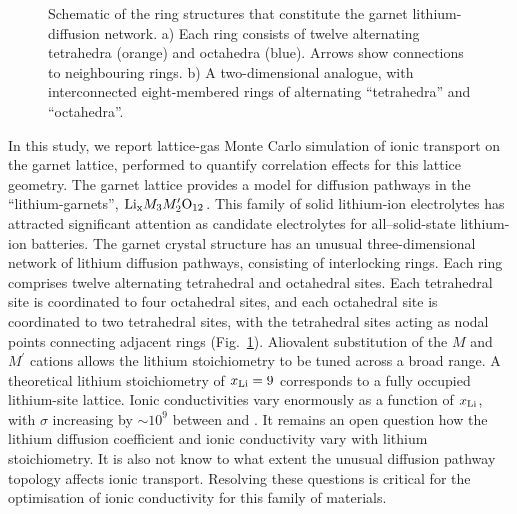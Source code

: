 \documentclass[aps,prb,twocolumn,superscriptaddress,reprint]{revtex4-1}
\newcommand{\xLi}{x_\m{Li}}
\begin{document}
\begin{figure}[tb]
  \centering
    \caption{\label{fig:garnet_network_schematic}Schematic of the ring structures that constitute the garnet lithium-diffusion network. a) Each ring consists of twelve alternating tetrahedra (orange) and octahedra (blue). 
Arrows show connections to neighbouring rings.\cite{AwakaEtAl_ChemLett2011} b) A two-dimensional analogue, with interconnected eight-membered rings of alternating ``tetrahedra'' and ``octahedra''.}
\end{figure}

In this study, we report lattice-gas Monte Carlo simulation of ionic transport on the garnet lattice, performed to quantify correlation effects for this lattice geometry. The garnet lattice provides a model for diffusion pathways in the ``lithium-garnets'', $\mathrm{Li}_{\mathrm{x}}M_3M^\prime_2\mathrm{O}_{12}$.\cite{ThangaduraiEtAl_JAmCeramSoc2003, ThangaduraiEtAl_JPhysChemLett2015} This family of solid lithium-ion electrolytes has attracted significant attention as candidate electrolytes for all--solid-state lithium-ion batteries.\cite{BachmanEtAl_ChemRev2016, InadaEtAl_FrontEnergyRes2016,HanEtAl_NatMater2016, RamakumarEtAl_ProgMaterSci2017} The garnet crystal structure has an unusual three-dimensional network of lithium diffusion pathways, consisting of interlocking rings.\cite{AwakaEtAl_ChemLett2011} Each ring comprises twelve alternating tetrahedral and octahedral sites. Each tetrahedral site is coordinated to four octahedral sites, and each octahedral site is coordinated to two tetrahedral sites, with the tetrahedral sites acting as nodal points connecting adjacent rings (Fig.~\ref{fig:garnet_network_schematic}).
Aliovalent substitution of the $M$ and $M^\prime$ cations allows the lithium stoichiometry to be tuned across a broad range. 
A theoretical lithium stoichiometry of $\xLi=9$ corresponds to a fully occupied lithium-site lattice. 
Ionic conductivities vary enormously as a function of $\xLi$, with $\sigma$ increasing by $\sim\!10^9$ between  and .\cite{ThangaduraiEtAl_JPhysChemLett2015, BachmanEtAl_ChemRev2016} It remains an open question how the lithium diffusion coefficient and ionic conductivity vary with lithium stoichiometry. It is also not know to what extent the unusual diffusion pathway topology affects ionic transport. Resolving these questions is critical for the optimisation of ionic conductivity for this family of materials.
\end{document}
